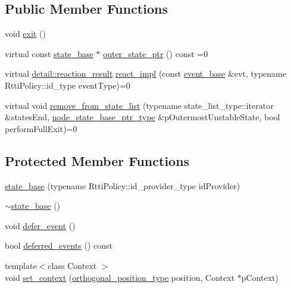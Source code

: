 \subsection*{Public Member Functions}
\begin{DoxyCompactItemize}
\item 
void \mbox{\hyperlink{classboost_1_1statechart_1_1detail_1_1state__base_a529d8f3f0b47ed7880e7c18608ac625d}{exit}} ()
\item 
virtual const \mbox{\hyperlink{classboost_1_1statechart_1_1detail_1_1state__base}{state\+\_\+base}} $\ast$ \mbox{\hyperlink{classboost_1_1statechart_1_1detail_1_1state__base_a03d51c261c052af1db3bb08b31891731}{outer\+\_\+state\+\_\+ptr}} () const =0
\item 
virtual \mbox{\hyperlink{namespaceboost_1_1statechart_1_1detail_ab091bbb4c29327fb46ee479ea1b7255b}{detail\+::reaction\+\_\+result}} \mbox{\hyperlink{classboost_1_1statechart_1_1detail_1_1state__base_a2aaeac79511df5c28dc43250c83d6881}{react\+\_\+impl}} (const \mbox{\hyperlink{classboost_1_1statechart_1_1event__base}{event\+\_\+base}} \&evt, typename Rtti\+Policy\+::id\+\_\+type event\+Type)=0
\item 
virtual void \mbox{\hyperlink{classboost_1_1statechart_1_1detail_1_1state__base_a4da77bbc62b6facf16ca3abc9e0d52ce}{remove\+\_\+from\+\_\+state\+\_\+list}} (typename state\+\_\+list\+\_\+type\+::iterator \&states\+End, \mbox{\hyperlink{classboost_1_1statechart_1_1detail_1_1state__base_a8e3dd0f80bf95d7df21417a50f1dbaa1}{node\+\_\+state\+\_\+base\+\_\+ptr\+\_\+type}} \&p\+Outermost\+Unstable\+State, bool perform\+Full\+Exit)=0
\end{DoxyCompactItemize}
\subsection*{Protected Member Functions}
\begin{DoxyCompactItemize}
\item 
\mbox{\hyperlink{classboost_1_1statechart_1_1detail_1_1state__base_a8baed501f8a37ab2d7eb14af9b214d33}{state\+\_\+base}} (typename Rtti\+Policy\+::id\+\_\+provider\+\_\+type id\+Provider)
\item 
\mbox{\hyperlink{classboost_1_1statechart_1_1detail_1_1state__base_a9092e4033508839cd796ef17625f7952}{$\sim$state\+\_\+base}} ()
\item 
void \mbox{\hyperlink{classboost_1_1statechart_1_1detail_1_1state__base_ad5d457512772c7435a988e3cb8ae80c8}{defer\+\_\+event}} ()
\item 
bool \mbox{\hyperlink{classboost_1_1statechart_1_1detail_1_1state__base_adec38068b28dcf1b23fd6945664eee77}{deferred\+\_\+events}} () const
\item 
{\footnotesize template$<$class Context $>$ }\\void \mbox{\hyperlink{classboost_1_1statechart_1_1detail_1_1state__base_a43bef6bd20792c22ef224e765d493903}{set\+\_\+context}} (\mbox{\hyperlink{namespaceboost_1_1statechart_1_1detail_a3bedea0b807a16fa222733417183d2c9}{orthogonal\+\_\+position\+\_\+type}} position, Context $\ast$p\+Context)
\end{DoxyCompactItemize}
